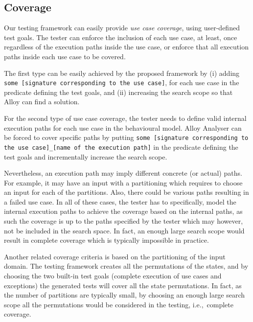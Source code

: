 %
%
\label{sec:discussion}
\subsection{Coverage}
\label{sec:discussion-coverage}
Our testing framework can easily provide \textit{use case coverage}, using user-defined test goals. The tester can enforce the inclusion of each use case, at least, once regardless of the execution paths inside the use case, or enforce that all execution paths inside each use case to be covered.

The first type can be easily achieved by the proposed framework by (i) adding \texttt{some [signature corresponding to the use case]}, for each use case in the predicate defining the test goals, and (ii) increasing the search scope so that Alloy can find a solution. 

For the second type of use case coverage, the tester needs to define valid internal execution paths for each use case in the behavioural model. Alloy Analyser can be forced to cover specific paths by putting \texttt{some [signature corresponding to the use case]\_[name of the execution path]} in the predicate defining the test goals and incrementally increase the search scope.

Nevertheless, an execution path may imply different concrete (or actual) paths. For example, it may have an input with a partitioning which requires to choose an input for each of the partitions. Also, there could be various paths resulting in a failed use case. In all of these cases, the tester has to specifically, model the internal execution paths to achieve the coverage  based on the internal paths, as such the coverage is up to the paths specified by the tester which may however, not be included in the search space. In fact, an enough large search scope would result in complete coverage which is typically impossible in practice.

Another related coverage criteria is based on the partitioning of the input domain. 
The testing framework creates all the permutations of the states, and by choosing the two built-in test goals (complete execution of use cases and exceptions) the generated tests will cover all the state permutations. In fact, as the number of partitions are typically small, by choosing an enough large search scope all the permutations would be considered in the testing, i.e.,\ complete coverage.

